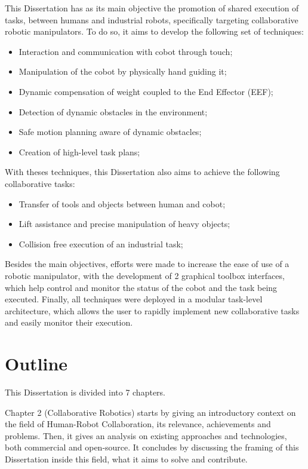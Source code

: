 \par This Dissertation has as its main objective the promotion of shared execution of tasks, between humans and industrial robots, specifically targeting collaborative robotic manipulators. To do so, it aims to develop the following set of techniques:

\begin{itemize}
    \item Interaction and communication with cobot through touch;
    \item Manipulation of the cobot by physically hand guiding it;
    \item Dynamic compensation of weight coupled to the End Effector (EEF);
    \item Detection of dynamic obstacles in the environment;
    \item Safe motion planning aware of dynamic obstacles;
    \item Creation of high-level task plans;
\end{itemize}

\par With theses techniques, this Dissertation also aims to achieve the following collaborative tasks:

\begin{itemize}
    \item Transfer of tools and objects between human and cobot;
    \item Lift assistance and precise manipulation of heavy objects;
    \item Collision free execution of an industrial task;
\end{itemize}

\par Besides the main objectives, efforts were made to increase the ease of use of a robotic manipulator, with the development of 2 graphical toolbox interfaces, which help control and monitor the status of the cobot and the task being executed. Finally, all techniques were deployed in a modular task-level architecture, which allows the user to rapidly implement new collaborative tasks and easily monitor their execution.



\section{Outline}

\par This Dissertation is divided into 7 chapters.
\par Chapter 2 (Collaborative Robotics) starts by giving an introductory context on the field of Human-Robot Collaboration, its relevance, achievements and problems. Then, it gives an analysis on existing approaches and technologies, both commercial and open-source. It concludes by discussing the framing of this Dissertation inside this field, what it aims to solve and contribute.

